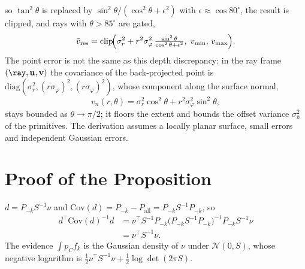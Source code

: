 so $\tan^{2}\theta$ is replaced by $\sin^{2}\theta/(\cos^{2}\theta+\epsilon^{2})$ with
$\epsilon\approx\cos80^{\circ}$, the result is clipped, and rays with $\theta>85^{\circ}$ are
gated,
\begin{equation}
  \tilde v_{\mathrm{res}}=\operatorname{clip}\!\Bigl(\sigma_{r}^{2}
  +r^{2}\sigma_{\varphi}^{2}\,\tfrac{\sin^{2}\theta}{\cos^{2}\theta+\epsilon^{2}},\;
  v_{\min},\,v_{\max}\Bigr).
  \label{eq:vreg}
\end{equation}
The point error is not the same as this depth discrepancy: in the ray frame
$(\ray,\mathbf{u},\mathbf{v})$ the covariance of the back-projected point is
$\mathrm{diag}(\sigma_r^2,(r\sigma_\varphi)^2,(r\sigma_\varphi)^2)$, whose component along the
surface normal,
\begin{equation}
  v_{n}(r,\theta)=\sigma_r^{2}\cos^{2}\theta+r^{2}\sigma_\varphi^{2}\sin^{2}\theta,
  \label{eq:vn}
\end{equation}
stays bounded as $\theta\to\pi/2$; it floors the extent and bounds the offset variance $\sigma_h^{2}$ of the primitives.
The derivation assumes a locally planar surface, small errors and independent Gaussian errors.

\section{Proof of the Proposition}
\label{app:proof}
$d=P_{-k}S^{-1}\nu$ and $\mathrm{Cov}(d)=P_{-k}-P_{\mathrm{all}}=P_{-k}S^{-1}P_{-k}$, so
\begin{align*}
d^{\top}\mathrm{Cov}(d)^{-1}d
 &=\nu^{\top}S^{-1}P_{-k}\bigl(P_{-k}S^{-1}P_{-k}\bigr)^{-1}P_{-k}S^{-1}\nu\\
 &=\nu^{\top}S^{-1}\nu .
\end{align*}
The evidence $\int p_C f_k$ is the Gaussian density of $\nu$ under $\mathcal{N}(0,S)$,
whose negative logarithm is $\tfrac12\nu^{\top}S^{-1}\nu+\tfrac12\log\det(2\pi S)$.

